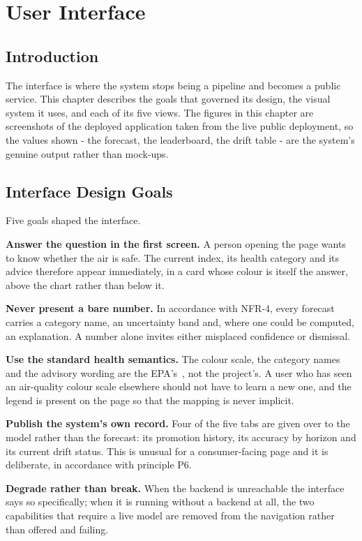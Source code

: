 \chapter{User Interface}
\label{ch:ui}

\section{Introduction}
The interface is where the system stops being a pipeline and becomes a public
service. This chapter describes the goals that governed its design, the visual
system it uses, and each of its five views. The figures in this chapter are
screenshots of the deployed application taken from the live public deployment, so
the values shown - the forecast, the leaderboard, the drift table - are the
system's genuine output rather than mock-ups.

\section{Interface Design Goals}
Five goals shaped the interface.

\textbf{Answer the question in the first screen.} A person opening the page wants
to know whether the air is safe. The current index, its health category and its
advice therefore appear immediately, in a card whose colour is itself the answer,
above the chart rather than below it.

\textbf{Never present a bare number.} In accordance with NFR-4, every forecast
carries a category name, an uncertainty band and, where one could be computed, an
explanation. A number alone invites either misplaced confidence or dismissal.

\textbf{Use the standard health semantics.} The colour scale, the category names
and the advisory wording are the EPA's~\cite{ref:epa}, not the project's. A user
who has seen an air-quality colour scale elsewhere should not have to learn a new
one, and the legend is present on the page so that the mapping is never implicit.

\textbf{Publish the system's own record.} Four of the five tabs are given over
to the model rather than the forecast: its promotion history, its accuracy by
horizon and its current drift status. This is unusual for a consumer-facing page
and it is deliberate, in accordance with principle P6.

\textbf{Degrade rather than break.} When the backend is unreachable the interface
says so specifically; when it is running without a backend at all, the two
capabilities that require a live model are removed from the navigation rather than
offered and failing.

